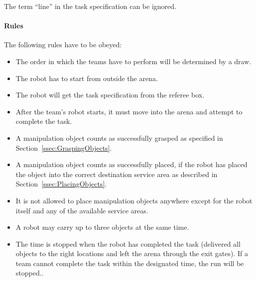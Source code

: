 The term “line” in the task specification can be ignored.

%

\paragraph{Rules}
The following rules have to be obeyed:

\begin{itemize}
\item The order in which the teams have to perform will be determined by a draw.
\item The robot has to start from outside the arena.
\item The robot will get the task specification from the referee box.
\item After the team's robot starts, it must move into the arena and attempt to complete the task. 
\item A manipulation object counts as successfully grasped as specified in Section~\ref{ssec:GraspingObjects}.
\item A manipulation object counts as successfully placed, if the robot has placed the object into the correct destination service area as described in Section~\ref{ssec:PlacingObjects}.
\item It is not allowed to place manipulation objects anywhere except for the robot itself and any of the available service areas.
\item A robot may carry up to three objects at the same time.
\item The time is stopped when the robot has completed the task (delivered all objects to the right locations and left the arena through the exit gates). If a team cannot complete the task within the designated time, the run will be stopped.. 

\end{itemize}


%
%
%
